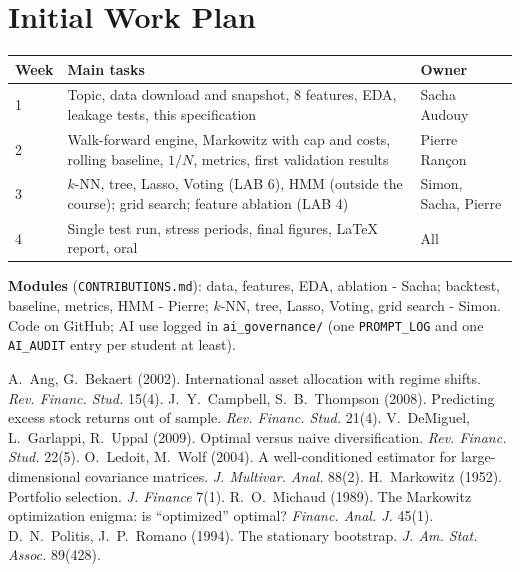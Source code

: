 \documentclass[11pt,a4paper]{article}
\newcommand{\changed}[1]{#1}
\begin{document}
\section{Initial Work Plan}
\begin{tabularx}{\linewidth}{@{}lLl@{}}
\toprule
Week & Main tasks & Owner\\ & Topic, data download and snapshot, 8 features, EDA, leakage tests, this specification & Sacha Audouy\\
2 & Walk-forward engine, Markowitz with cap and costs, rolling baseline, $1/N$, metrics, first validation results & Pierre Rançon\\
3 & \changed{$k$-NN, tree, Lasso, Voting (LAB 6), HMM (outside the course); grid search; feature ablation (LAB 4)} & \changed{Simon, Sacha, Pierre}\\
4 & Single test run, stress periods, \changed{final figures}, LaTeX report, oral & All\\\bottomrule
\end{tabularx}

\smallskip
\changed{\textbf{Modules} (\texttt{CONTRIBUTIONS.md}): data, features, EDA, ablation - Sacha; backtest, baseline, metrics, HMM - Pierre; $k$-NN, tree, Lasso, Voting, grid search - Simon. Code on GitHub; AI use logged in \texttt{ai\_governance/} (one \texttt{PROMPT\_LOG} and one \texttt{AI\_AUDIT} entry per student at least).}

\begin{thebibliography}{9}\footnotesize
\setlength{\itemsep}{0pt}
 A.~Ang, G.~Bekaert (2002). International asset allocation with regime shifts. \emph{Rev. Financ. Stud.} 15(4).
 J.~Y.~Campbell, S.~B.~Thompson (2008). Predicting excess stock returns out of sample. \emph{Rev. Financ. Stud.} 21(4).
 V.~DeMiguel, L.~Garlappi, R.~Uppal (2009). Optimal versus naive diversification. \emph{Rev. Financ. Stud.} 22(5).
 O.~Ledoit, M.~Wolf (2004). A well-conditioned estimator for large-dimensional covariance matrices. \emph{J. Multivar. Anal.} 88(2).
 H.~Markowitz (1952). Portfolio selection. \emph{J. Finance} 7(1).
 R.~O.~Michaud (1989). The Markowitz optimization enigma: is ``optimized'' optimal? \emph{Financ. Anal. J.} 45(1).
 D.~N.~Politis, J.~P.~Romano (1994). The stationary bootstrap. \emph{J. Am. Stat. Assoc.} 89(428).
\end{thebibliography}
\end{document}
